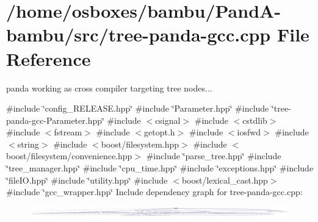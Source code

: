 \hypertarget{tree-panda-gcc_8cpp}{}\section{/home/osboxes/bambu/\+Pand\+A-\/bambu/src/tree-\/panda-\/gcc.cpp File Reference}
\label{tree-panda-gcc_8cpp}


panda working as cross compiler targeting tree nodes...  


{\ttfamily \#include \char`\"{}config\+\_\+\+R\+E\+L\+E\+A\+S\+E.\+hpp\char`\"{}}\newline
{\ttfamily \#include \char`\"{}Parameter.\+hpp\char`\"{}}\newline
{\ttfamily \#include \char`\"{}tree-\/panda-\/gcc-\/\+Parameter.\+hpp\char`\"{}}\newline
{\ttfamily \#include $<$csignal$>$}\newline
{\ttfamily \#include $<$cstdlib$>$}\newline
{\ttfamily \#include $<$fstream$>$}\newline
{\ttfamily \#include $<$getopt.\+h$>$}\newline
{\ttfamily \#include $<$iosfwd$>$}\newline
{\ttfamily \#include $<$string$>$}\newline
{\ttfamily \#include $<$boost/filesystem.\+hpp$>$}\newline
{\ttfamily \#include $<$boost/filesystem/convenience.\+hpp$>$}\newline
{\ttfamily \#include \char`\"{}parse\+\_\+tree.\+hpp\char`\"{}}\newline
{\ttfamily \#include \char`\"{}tree\+\_\+manager.\+hpp\char`\"{}}\newline
{\ttfamily \#include \char`\"{}cpu\+\_\+time.\+hpp\char`\"{}}\newline
{\ttfamily \#include \char`\"{}exceptions.\+hpp\char`\"{}}\newline
{\ttfamily \#include \char`\"{}file\+I\+O.\+hpp\char`\"{}}\newline
{\ttfamily \#include \char`\"{}utility.\+hpp\char`\"{}}\newline
{\ttfamily \#include $<$boost/lexical\+\_\+cast.\+hpp$>$}\newline
{\ttfamily \#include \char`\"{}gcc\+\_\+wrapper.\+hpp\char`\"{}}\newline
Include dependency graph for tree-\/panda-\/gcc.cpp\+:
\nopagebreak
\begin{figure}[H]
\begin{center}
\leavevmode
\includegraphics[width=350pt]{d7/dbd/tree-panda-gcc_8cpp__incl}
\end{center}
\end{figure}
